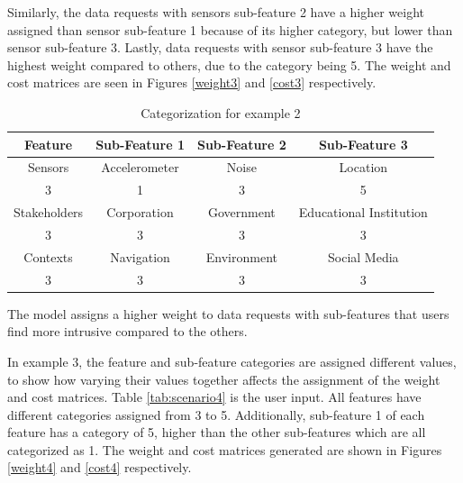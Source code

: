 Similarly, the data requests with sensors sub-feature 2 have a higher weight assigned than sensor sub-feature 1 because of its higher category, but lower than sensor sub-feature 3. Lastly, data requests with sensor sub-feature 3 have the highest weight compared to others, due to the category being 5. The weight and cost matrices are seen in Figures \ref{weight3} and \ref{cost3} respectively.

\begin{table}[h!]
  \centering
  \caption{Categorization for example 2}
  \label{tab:scenario3}
  \begin{tabular}{cccc}
    \toprule
    Feature & Sub-Feature 1 & Sub-Feature 2 & Sub-Feature 3\\
    \midrule
    Sensors & Accelerometer & Noise & Location\\
     3 & 1 & 3 & 5\\ \hhline{====}
     Stakeholders & Corporation & Government & Educational Institution\\
     3 & 3 & 3 & 3\\ \hhline{====}
     Contexts & Navigation & Environment & Social Media\\
     3 & 3 & 3 & 3\\ 
    \bottomrule
  \end{tabular}
\end{table}

% 


%


The model assigns a higher weight to data requests with sub-features that users find more intrusive compared to the others.

In example 3, the feature and sub-feature categories are assigned different values, to show how varying their values together affects the assignment of the weight and cost matrices. Table \ref{tab:scenario4} is the user input. All features have different categories assigned from 3 to 5. Additionally, sub-feature 1 of each feature has a category of 5, higher than the other sub-features which are all categorized as 1. The weight and cost matrices generated are shown in Figures \ref{weight4} and \ref{cost4} respectively. 

